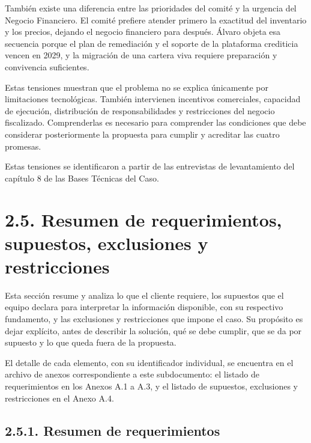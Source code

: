 \documentclass[11pt]{article}
\begin{document}
También existe una diferencia entre las prioridades del comité y la urgencia del Negocio Financiero. El comité prefiere atender primero la exactitud del inventario y los precios, dejando el negocio financiero para después. Álvaro objeta esa secuencia porque el plan de remediación y el soporte de la plataforma crediticia vencen en 2029, y la migración de una cartera viva requiere preparación y convivencia suficientes.

Estas tensiones muestran que el problema no se explica únicamente por limitaciones tecnológicas. También intervienen incentivos comerciales, capacidad de ejecución, distribución de responsabilidades y restricciones del negocio fiscalizado. Comprenderlas es necesario para comprender las condiciones que debe considerar posteriormente la propuesta para cumplir y acreditar las cuatro promesas.

Estas tensiones se identificaron a partir de las entrevistas de levantamiento del capítulo 8 de las Bases Técnicas del Caso.

\section{2.5. Resumen de requerimientos, supuestos, exclusiones y restricciones}\label{resumen-de-requerimientos-supuestos-exclusiones-y-restricciones}

Esta sección resume y analiza lo que el cliente requiere, los supuestos que el equipo declara para interpretar la información disponible, con su respectivo fundamento, y las exclusiones y restricciones que impone el caso. Su propósito es dejar explícito, antes de describir la solución, qué se debe cumplir, que se da por supuesto y lo que queda fuera de la propuesta. 

El detalle de cada elemento, con su identificador individual, se encuentra en el archivo de anexos correspondiente a este subdocumento: el listado de requerimientos en los Anexos A.1 a A.3, y el listado de supuestos, exclusiones y restricciones en el Anexo A.4.

\subsection{2.5.1. Resumen de requerimientos}\label{resumen-de-requerimientos}
\end{document}
